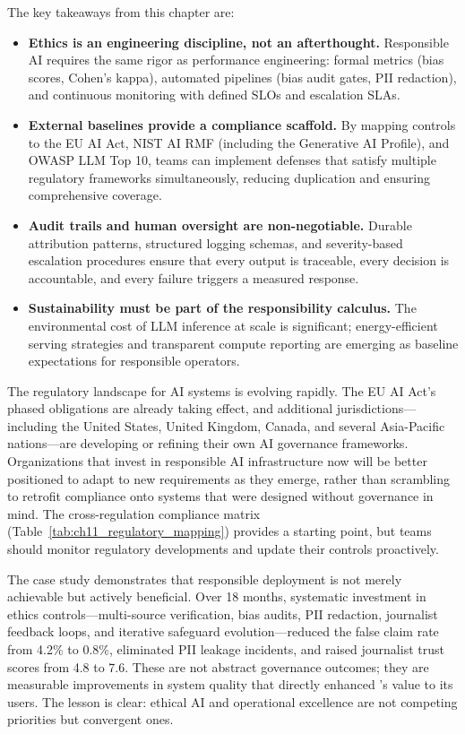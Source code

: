 The key takeaways from this chapter are:
\begin{itemize}
    \item \textbf{Ethics is an engineering discipline, not an afterthought.} Responsible AI requires the same rigor as performance engineering: formal metrics (bias scores, Cohen's kappa), automated pipelines (bias audit gates, PII redaction), and continuous monitoring with defined SLOs and escalation SLAs.
    \item \textbf{External baselines provide a compliance scaffold.} By mapping controls to the EU AI Act, NIST AI RMF (including the Generative AI Profile), and OWASP LLM Top 10, teams can implement defenses that satisfy multiple regulatory frameworks simultaneously, reducing duplication and ensuring comprehensive coverage.
    \item \textbf{Audit trails and human oversight are non-negotiable.} Durable attribution patterns, structured logging schemas, and severity-based escalation procedures ensure that every output is traceable, every decision is accountable, and every failure triggers a measured response.
    \item \textbf{Sustainability must be part of the responsibility calculus.} The environmental cost of LLM inference at scale is significant; energy-efficient serving strategies and transparent compute reporting are emerging as baseline expectations for responsible operators.
\end{itemize}

The regulatory landscape for AI systems is evolving rapidly. The EU AI Act's phased obligations are already taking effect, and additional jurisdictions---including the United States, United Kingdom, Canada, and several Asia-Pacific nations---are developing or refining their own AI governance frameworks. Organizations that invest in responsible AI infrastructure now will be better positioned to adapt to new requirements as they emerge, rather than scrambling to retrofit compliance onto systems that were designed without governance in mind. The cross-regulation compliance matrix (Table~\ref{tab:ch11_regulatory_mapping}) provides a starting point, but teams should monitor regulatory developments and update their controls proactively.

The \ishtar{} case study demonstrates that responsible deployment is not merely achievable but actively beneficial. Over 18 months, systematic investment in ethics controls---multi-source verification, bias audits, PII redaction, journalist feedback loops, and iterative safeguard evolution---reduced the false claim rate from 4.2\% to 0.8\%, eliminated PII leakage incidents, and raised journalist trust scores from 4.8 to 7.6. These are not abstract governance outcomes; they are measurable improvements in system quality that directly enhanced \ishtar{}'s value to its users. The lesson is clear: ethical AI and operational excellence are not competing priorities but convergent ones.

